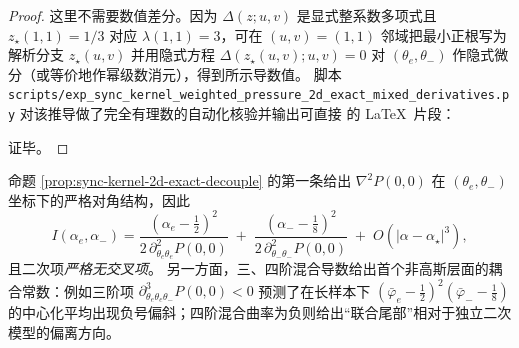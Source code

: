 \begin{proof}
这里不需要数值差分。因为 \(\Delta(z;u,v)\) 是显式整系数多项式且
\(
z_\star(1,1)=1/3
\)
对应 \(\lambda(1,1)=3\)，可在 \((u,v)=(1,1)\) 邻域把最小正根写为解析分支
\(
z_\star(u,v)
\)
并用隐式方程 \(\Delta(z_\star(u,v);u,v)=0\) 对 \((\theta_e,\theta_-)\) 作隐式微分（或等价地作幂级数消元），得到所示导数值。
脚本 \texttt{scripts/exp\_sync\_kernel\_weighted\_pressure\_2d\_exact\_mixed\_derivatives.py} 对该推导做了完全有理数的自动化核验并输出可直接 \verb|| 的 \LaTeX\ 片段：

证毕。
\end{proof}

\begin{remark}\label{rem:sync-kernel-2d-nongaussian-coupling}
命题 \ref{prop:sync-kernel-2d-exact-decouple} 的第一条给出
\(
\nabla^2 P(0,0)
\)
在 \((\theta_e,\theta_-)\) 坐标下的严格对角结构，因此
\[
I(\alpha_e,\alpha_-)
=\frac{(\alpha_e-\frac12)^2}{2\,\partial^2_{\theta_e\theta_e}P(0,0)}
\;+\;
\frac{(\alpha_--\frac18)^2}{2\,\partial^2_{\theta_-\theta_-}P(0,0)}
\;+\;O(|\alpha-\alpha_\star|^3),
\]
且二次项\emph{严格无交叉项}。
另一方面，三、四阶混合导数给出首个非高斯层面的耦合常数：例如三阶项
\(
\partial^3_{\theta_e\theta_e\theta_-}P(0,0)<0
\)
预测了在长样本下
\(
(\bar\varphi_e-\tfrac12)^2(\bar\varphi_- -\tfrac18)
\)
的中心化平均出现负号偏斜；四阶混合曲率为负则给出“联合尾部”相对于独立二次模型的偏离方向。
\end{remark}

